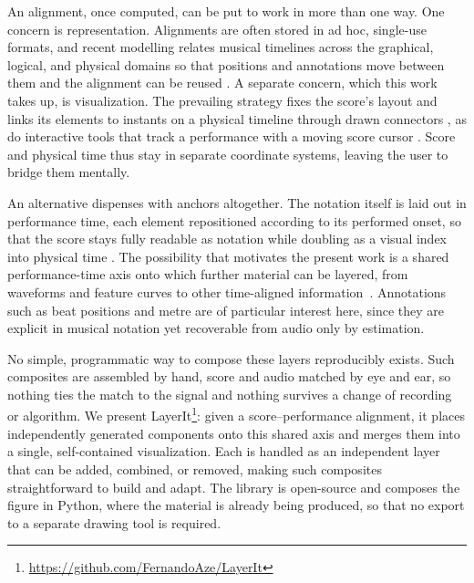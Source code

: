 \documentclass{article}
\begin{document}
An alignment, once computed, can be put to work in more than one way. One concern is representation. Alignments are often stored in ad hoc, single-use formats, and recent modelling relates musical timelines across the graphical, logical, and physical domains so that positions and annotations move between them and the alignment can be reused \cite{hentschel2026TimeAlignModelling}. A separate concern, which this work takes up, is visualization. The prevailing strategy fixes the score's layout and links its elements to instants on a physical timeline through drawn connectors \cite{thomas2012LinkingSheetMusic}, as do interactive tools that track a performance with a moving score cursor \cite{jiang2025PianoPrecisionAdvancing}. Score and physical time thus stay in separate coordinate systems, leaving the user to bridge them mentally.

An alternative dispenses with anchors altogether. The notation itself is laid out in performance time, each element repositioned according to its performed onset, so that the score stays fully readable as notation while doubling as a visual index into physical time \cite{goebl2025LetsScoreWarpAgain}. The possibility that motivates the present work is a shared performance-time axis onto which further material can be layered, from waveforms and feature curves to other time-aligned information~\cite{pinto2020ShiftIfYou}. Annotations such as beat positions and metre are of particular interest here, since they are explicit in musical notation yet recoverable from audio only by estimation.

No simple, programmatic way to compose these layers reproducibly exists. Such composites are assembled by hand, score and audio matched by eye and ear, so nothing ties the match to the signal and nothing survives a change of recording or algorithm.
We present LayerIt\footnote{\url{https://github.com/FernandoAze/LayerIt}}: given a score--performance alignment, it places independently generated components onto this shared axis and merges them into a single, self-contained visualization. Each is handled as an independent layer that can be added, combined, or removed, making such composites straightforward to build and adapt. The library is open-source and composes the figure in Python, where the material is already being produced, so that no export to a separate drawing tool is required.
%
\end{document}
